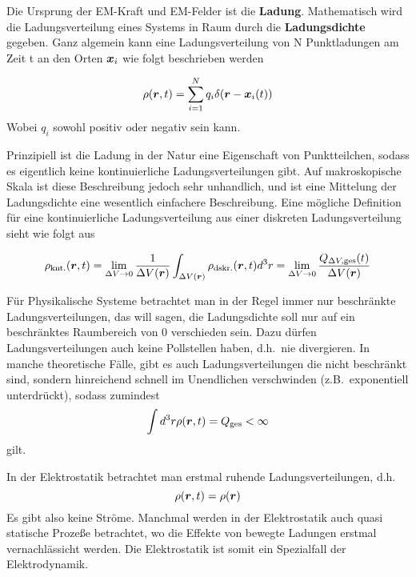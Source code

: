 Die Ursprung der EM-Kraft und EM-Felder ist die \textbf{Ladung}. Mathematisch wird die
Ladungsverteilung eines Systems in Raum durch die \textbf{Ladungsdichte} 
gegeben. Ganz algemein
kann eine Ladungsverteilung von N Punktladungen am Zeit t an den Orten $\vb*x_i$ wie folgt beschrieben werden

\begin{equation}
  \rho(\vb*r, t)= \sum_{i=1}^N q_i \delta(\vb*r - \vb*x_i(t))
\end{equation}
Wobei $q_i$ sowohl positiv oder negativ sein kann.

Prinzipiell ist die Ladung in der Natur eine Eigenschaft von Punktteilchen,
sodass es eigentlich keine kontinuierliche Ladungsverteilungen gibt. Auf
makroskopische Skala ist diese Beschreibung jedoch sehr unhandlich, und ist
eine Mittelung der Ladungsdichte eine wesentlich einfachere Beschreibung.
Eine mögliche Definition für eine kontinuierliche Ladungsverteilung aus einer
diskreten Ladungsverteilung sieht wie folgt aus

\begin{equation}
  \rho_{\textrm{knt.}}(\vb*r, t) 
  = 
  \lim_{\Delta V \to 0} 
  \frac{1}{\Delta V(\vb*r)} 
  \int_{\Delta V(\vb*r)} \rho_{\textrm{dskr.}}(\vb*r, t)d^3r 
  =
  \lim_{\Delta V \to 0} \frac{Q_{\Delta V, \textrm{ges}}(t)}{\Delta V(\vb*r)} 
\end{equation}

Für Physikalische Systeme betrachtet man in der Regel immer nur beschränkte 
Ladungsverteilungen, das will sagen, die Ladungsdichte soll nur auf 
ein beschränktes Raumbereich von 0 verschieden sein. 
Dazu dürfen Ladungsverteilungen auch keine Pollstellen haben, 
d.h.\ nie divergieren. 
In manche theoretische Fälle, gibt es auch Ladungsverteilungen die 
nicht beschränkt sind, sondern hinreichend schnell im Unendlichen 
verschwinden (z.B.\ exponentiell unterdrückt), sodass zumindest
\begin{equation*}
  \int d^3r \rho(\vb*r, t) = Q_\textrm{ges} < \infty
\end{equation*}
gilt.

In der Elektrostatik betrachtet man erstmal ruhende Ladungsverteilungen, 
d.h.
\begin{equation}
  \rho(\vb*r, t) = \rho(\vb*r)
\end{equation}
Es gibt also keine Ströme. Manchmal werden in der Elektrostatik auch 
quasi statische Prozeße betrachtet, wo die Effekte von bewegte Ladungen 
erstmal vernachlässicht werden. Die Elektrostatik ist somit ein Spezialfall
der Elektrodynamik.
